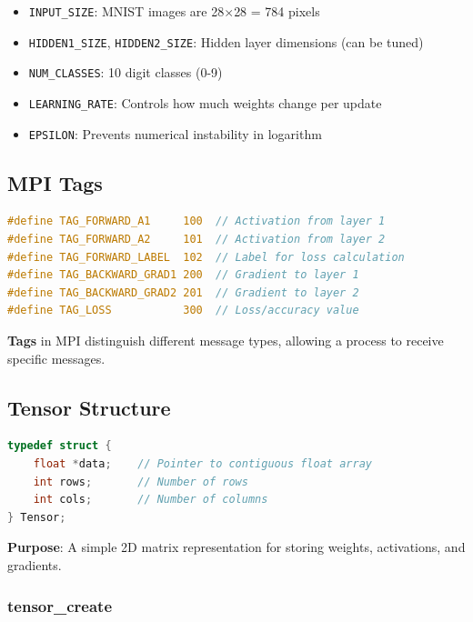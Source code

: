\documentclass[11pt,a4paper]{article}
\begin{document}
\begin{itemize}
    \item \texttt{INPUT\_SIZE}: MNIST images are 28$\times$28 = 784 pixels
    \item \texttt{HIDDEN1\_SIZE}, \texttt{HIDDEN2\_SIZE}: Hidden layer dimensions (can be tuned)
    \item \texttt{NUM\_CLASSES}: 10 digit classes (0-9)
    \item \texttt{LEARNING\_RATE}: Controls how much weights change per update
    \item \texttt{EPSILON}: Prevents numerical instability in logarithm
\end{itemize}

\subsection{MPI Tags}

\begin{lstlisting}[language=C, caption={MPI communication tags}]
#define TAG_FORWARD_A1     100  // Activation from layer 1
#define TAG_FORWARD_A2     101  // Activation from layer 2
#define TAG_FORWARD_LABEL  102  // Label for loss calculation
#define TAG_BACKWARD_GRAD1 200  // Gradient to layer 1
#define TAG_BACKWARD_GRAD2 201  // Gradient to layer 2
#define TAG_LOSS           300  // Loss/accuracy value
\end{lstlisting}

\textbf{Tags} in MPI distinguish different message types, allowing a process to receive specific messages.

\subsection{Tensor Structure}

\begin{lstlisting}[language=C, caption={Tensor data structure}]
typedef struct {
    float *data;    // Pointer to contiguous float array
    int rows;       // Number of rows
    int cols;       // Number of columns
} Tensor;
\end{lstlisting}

\textbf{Purpose}: A simple 2D matrix representation for storing weights, activations, and gradients.

\subsubsection{tensor\_create}
\end{document}
